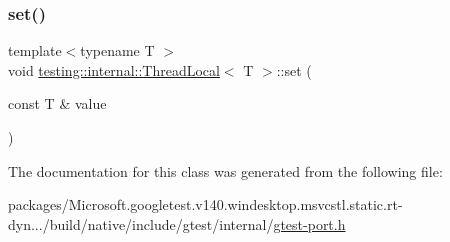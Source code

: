 \mbox{\label{classtesting_1_1internal_1_1_thread_local_ab5ebc7ba07426cef7167afa2a7707eb4}} 
\subsubsection{\texorpdfstring{set()}{set()}}
{\footnotesize\ttfamily template$<$typename T $>$ \\
void \mbox{\hyperlink{classtesting_1_1internal_1_1_thread_local}{testing\+::internal\+::\+Thread\+Local}}$<$ T $>$\+::set (\begin{DoxyParamCaption}\item[{const T \&}]{value }\end{DoxyParamCaption})\hspace{0.3cm}{\ttfamily [inline]}}



The documentation for this class was generated from the following file\+:\begin{DoxyCompactItemize}
\item 
packages/\+Microsoft.\+googletest.\+v140.\+windesktop.\+msvcstl.\+static.\+rt-\/dyn.../build/native/include/gtest/internal/\mbox{\hyperlink{gtest-port_8h}{gtest-\/port.\+h}}\end{DoxyCompactItemize}
